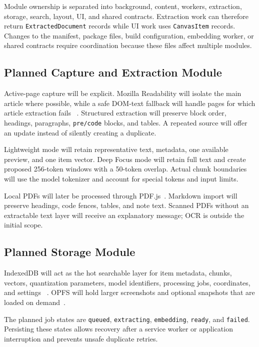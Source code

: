 \documentclass{tietreport}
\begin{document}
Module ownership is separated into background, content, workers, extraction, storage, search,
layout, UI, and shared contracts. Extraction work can therefore return
\texttt{ExtractedDocument} records while UI work uses \texttt{CanvasItem} records. Changes to
the manifest, package files, build configuration, embedding worker, or shared contracts require
coordination because these files affect multiple modules.

\subsection{Planned Capture and Extraction Module}

Active-page capture will be explicit. Mozilla Readability will isolate the main article where
possible, while a safe DOM-text fallback will handle pages for which article extraction fails
~\cite{readability}. Structured extraction will preserve block order, headings, paragraphs,
\texttt{pre/code} blocks, and tables. A repeated source will offer an update instead of
silently creating a duplicate.

Lightweight mode will retain representative text, metadata, one available preview, and one
item vector. Deep Focus mode will retain full text and create proposed 256-token windows with
a 50-token overlap. Actual chunk boundaries will use the model tokenizer and account for
special tokens and input limits.

Local PDFs will later be processed through PDF.js~\cite{pdfjs}. Markdown import will preserve
headings, code fences, tables, and note text. Scanned PDFs without an extractable text layer
will receive an explanatory message; OCR is outside the initial scope.

\subsection{Planned Storage Module}

IndexedDB will act as the hot searchable layer for item metadata, chunks, vectors,
quantization parameters, model identifiers, processing jobs, coordinates, and settings
~\cite{indexeddb}. OPFS will hold larger screenshots and optional snapshots that are loaded on
demand~\cite{opfs}.

The planned job states are \texttt{queued}, \texttt{extracting}, \texttt{embedding},
\texttt{ready}, and \texttt{failed}. Persisting these states allows recovery after a service
worker or application interruption and prevents unsafe duplicate retries.
\end{document}
